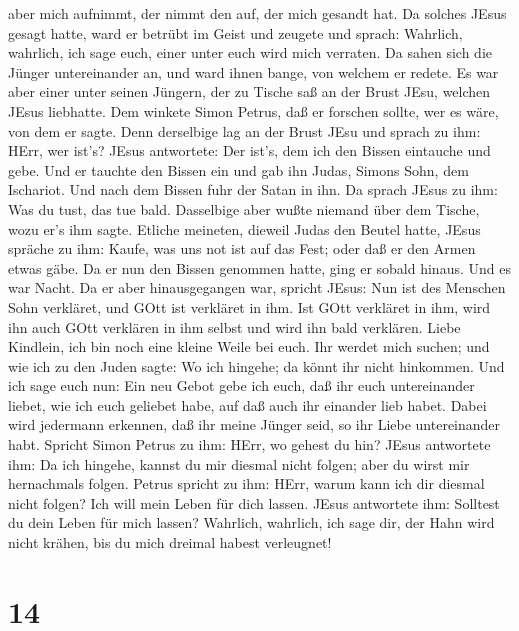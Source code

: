 aber mich aufnimmt, der nimmt den auf, der mich gesandt hat.
 Da solches JEsus gesagt hatte, ward er betrübt im Geist
und zeugete und sprach: Wahrlich, wahrlich, ich sage euch, einer unter
euch wird mich verraten.  Da sahen sich die Jünger
untereinander an, und ward ihnen bange, von welchem er redete.
 Es war aber einer unter seinen Jüngern, der zu Tische saß
an der Brust JEsu, welchen JEsus liebhatte.  Dem winkete
Simon Petrus, daß er forschen sollte, wer es wäre, von dem er sagte.
 Denn derselbige lag an der Brust JEsu und sprach zu ihm:
HErr, wer ist's?  JEsus antwortete: Der ist's, dem ich den
Bissen eintauche und gebe. Und er tauchte den Bissen ein und gab ihn
Judas, Simons Sohn, dem Ischariot.  Und nach dem Bissen
fuhr der Satan in ihn. Da sprach JEsus zu ihm: Was du tust, das tue
bald.  Dasselbige aber wußte niemand über dem Tische, wozu
er's ihm sagte.  Etliche meineten, dieweil Judas den Beutel
hatte, JEsus spräche zu ihm: Kaufe, was uns not ist auf das Fest; oder
daß er den Armen etwas gäbe.  Da er nun den Bissen genommen
hatte, ging er sobald hinaus. Und es war Nacht.  Da er aber
hinausgegangen war, spricht JEsus: Nun ist des Menschen Sohn verkläret,
und GOtt ist verkläret in ihm.  Ist GOtt verkläret in ihm,
wird ihn auch GOtt verklären in ihm selbst und wird ihn bald verklären.
 Liebe Kindlein, ich bin noch eine kleine Weile bei euch.
Ihr werdet mich suchen; und wie ich zu den Juden sagte: Wo ich hingehe;
da könnt ihr nicht hinkommen.  Und ich sage euch nun: Ein
neu Gebot gebe ich euch, daß ihr euch untereinander liebet, wie ich euch
geliebet habe, auf daß auch ihr einander lieb habet.  Dabei
wird jedermann erkennen, daß ihr meine Jünger seid, so ihr Liebe
untereinander habt.  Spricht Simon Petrus zu ihm: HErr, wo
gehest du hin? JEsus antwortete ihm: Da ich hingehe, kannst du mir
diesmal nicht folgen; aber du wirst mir hernachmals folgen.
 Petrus spricht zu ihm: HErr, warum kann ich dir diesmal
nicht folgen? Ich will mein Leben für dich lassen.  JEsus
antwortete ihm: Solltest du dein Leben für mich lassen? Wahrlich,
wahrlich, ich sage dir, der Hahn wird nicht krähen, bis du mich dreimal
habest verleugnet!

\hypertarget{section-13}{%
\section{14}\label{section-13}}

